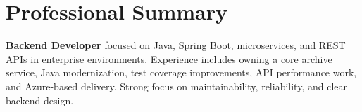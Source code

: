 \section*{Professional Summary}
\textbf{Backend Developer} focused on Java, Spring Boot, microservices, and REST APIs in enterprise environments. Experience includes owning a core archive service, Java modernization, test coverage improvements, API performance work, and Azure-based delivery. Strong focus on maintainability, reliability, and clear backend design.
